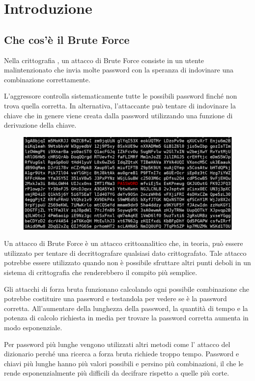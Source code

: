 \chapter{Introduzione}
\section{Che cos'è il Brute Force}
Nella crittografia , un attacco di Brute Force consiste in un utente malintenzionato che invia molte password con la speranza di indovinare una combinazione correttamente.

L'aggressore controlla sistematicamente tutte le possibili password finché non trova quella corretta. In alternativa, l'attaccante può tentare di indovinare la chiave che in genere viene creata dalla password utilizzando una funzione di derivazione della chiave.
\begin{figure}[h] 
    \centering
    \includegraphics[width=115mm]{Immagini/introduzione/banner.png}
\end{figure}

Un attacco di Brute Force è un attacco crittoanalitico che, in teoria, può essere utilizzato per tentare di decrittografare qualsiasi dato crittografato. Tale attacco potrebbe essere utilizzato quando non è possibile sfruttare altri punti deboli in un sistema di crittografia che renderebbero il compito più semplice.

Gli attacchi di forza bruta funzionano calcolando ogni possibile combinazione che potrebbe costituire una password e testandola per vedere se è la password corretta. All'aumentare della lunghezza della password, la quantità di tempo e la potenza di calcolo richiesta in media per trovare la password corretta aumenta in modo esponenziale.

Per password più lunghe vengono utilizzati altri metodi come l' attacco del dizionario perché una ricerca a forza bruta richiede troppo tempo. Password e chiavi più lunghe hanno più valori possibili e persino più combinazioni, il che le rende esponenzialmente più difficili da decifrare rispetto a quelle più corte.

